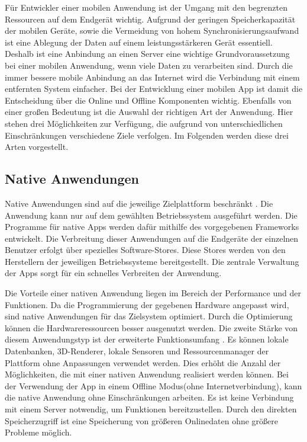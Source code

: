 Für Entwickler einer mobilen Anwendung ist der Umgang mit den begrenzten Ressourcen auf dem Endgerät wichtig. 
Aufgrund der geringen Speicherkapazität der mobilen Geräte, sowie die Vermeidung von hohem Synchronisierungsaufwand ist eine Ablegung der Daten auf einem leistungsstärkeren Gerät essentiell. Deshalb ist eine Anbindung an einen Server eine wichtige Grundvoraussetzung bei einer mobilen Anwendung, wenn viele Daten zu verarbeiten sind.  Durch die immer bessere mobile Anbindung an das Internet wird die Verbindung mit einem entfernten System einfacher. Bei der Entwicklung einer mobilen App ist damit die Entscheidung über die Online und Offline Komponenten wichtig.
Ebenfalls von einer großen Bedeutung ist die Auswahl der richtigen Art der Anwendung. Hier stehen drei Möglichkeiten zur Verfügung, die aufgrund von unterschiedlichen Einschränkungen verschiedene Ziele verfolgen. Im Folgenden werden diese drei Arten vorgestellt.

\subsection{Native Anwendungen}
Native Anwendungen sind auf die jeweilige Zielplattform beschränkt \cite{bib:mobilePlattform}. Die Anwendung kann nur auf dem gewählten Betriebssystem ausgeführt werden. Die Programme für native Apps werden dafür mithilfe des vorgegebenen Frameworks entwickelt. Die Verbreitung dieser Anwendungen auf die Endgeräte der einzelnen Benutzer erfolgt über spezielles Software-Stores. Diese Stores werden von den Herstellern der jeweiligen Betriebssysteme bereitgestellt. Die zentrale Verwaltung der Apps sorgt für ein schnelles Verbreiten der Anwendung. \par

 Die Vorteile einer nativen Anwendung liegen im Bereich der Performance und der Funktionen. Da die Programmierung der gegebenen Hardware angepasst wird, sind native Anwendungen für das Zielsystem optimiert. Durch die Optimierung können die Hardwareressourcen besser ausgenutzt werden. Die zweite Stärke von diesem Anwendungstyp ist der erweiterte Funktionsumfang \cite{bib:nativeBS2}. Es können lokale Datenbanken, 3D-Renderer, lokale Sensoren und Ressourcenmanager der Plattform ohne Anpassungen verwendet werden. Dies erhöht die Anzahl der Möglichkeiten, die mit einer nativen Anwendung realisiert werden können. Bei der Verwendung der App in einem Offline Modus(ohne Internetverbindung), kann die native Anwendung ohne Einschränkungen arbeiten. Es ist keine Verbindung mit einem Server notwendig, um Funktionen bereitzustellen. Durch den direkten Speicherzugriff ist eine Speicherung von größeren Onlinedaten ohne größere Probleme möglich. \par
 
